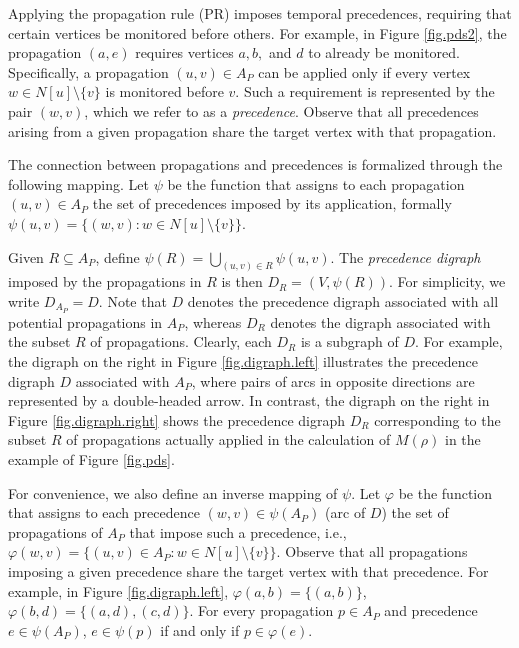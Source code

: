 \documentclass{article}
\begin{document}
Applying the propagation rule (PR) imposes temporal precedences, requiring that certain vertices be monitored before others.
For example, in Figure \ref{fig.pds2}, the propagation $(a,e)$ requires vertices $a,b,$ and $d$ to already be monitored.
Specifically, a propagation $(u,v) \in A_P$ can be applied only if every vertex $w \in N[u] \setminus \{v\}$ is monitored before $v$.
Such a requirement is represented by the pair $(w,v)$, which we refer to as a \emph{precedence}.
Observe that all precedences arising from a given propagation share the target vertex with that propagation.

The connection between propagations and precedences is formalized through the following mapping.
Let $\psi$ be the function that assigns to each propagation $(u,v) \in A_P$ the set of precedences imposed by its application, formally $\psi(u,v) = \{(w,v): w \in N[u] \setminus \{v\}\}$.

Given $R \subseteq A_P$, define $\psi(R) = \bigcup_{(u,v) \in R} \psi(u,v)$.
The \emph{precedence digraph} imposed by the propagations in $R$ is then $D_R = (V, \psi(R))$.
For simplicity, we write $D_{A_P} = D$. 
Note that $D$ denotes the precedence digraph associated with all potential propagations in $A_P$, whereas $D_R$ denotes the digraph associated with the subset $R$ of propagations.
Clearly, each $D_R$ is a subgraph of $D$.
For example, the digraph on the right in Figure \ref{fig.digraph.left} illustrates the precedence digraph $D$ associated with $A_P$, where pairs of arcs in opposite directions are represented by a double-headed arrow.
In contrast, the digraph on the right in Figure \ref{fig.digraph.right} shows the precedence digraph $D_R$ corresponding to the subset $R$ of propagations actually applied in the calculation of $M(\rho)$ in the example of Figure \ref{fig.pds}.

For convenience, we also define an inverse mapping of $\psi$.
Let $\varphi$ be the function that assigns to each precedence $(w,v) \in \psi(A_P)$ (arc of $D$) the set of propagations of $A_P$ that impose such a precedence, i.e., $\varphi(w,v) = \{(u,v) \in A_P: w \in N[u] \setminus \{v\} \}$.
Observe that all propagations imposing a given precedence share the target vertex with that precedence.
For example, in Figure \ref{fig.digraph.left}, $\varphi(a,b) = \{(a,b)\}$, $\varphi(b,d) = \{(a,d),(c,d)\}$.
For every propagation $p \in A_P$ and precedence $e \in \psi(A_P)$, $e \in \psi(p)$ if and only if $p \in \varphi(e)$.
\end{document}
